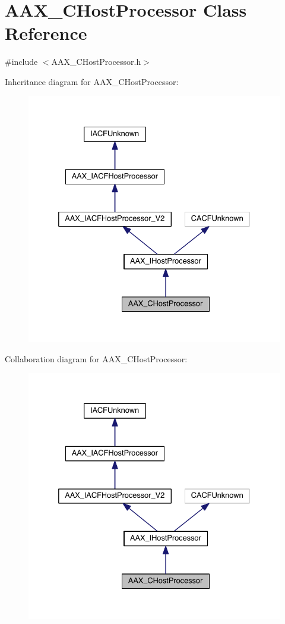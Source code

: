 \hypertarget{a00020}{}\section{A\+A\+X\+\_\+\+C\+Host\+Processor Class Reference}
\label{a00020}


{\ttfamily \#include $<$A\+A\+X\+\_\+\+C\+Host\+Processor.\+h$>$}



Inheritance diagram for A\+A\+X\+\_\+\+C\+Host\+Processor\+:
\nopagebreak
\begin{figure}[H]
\begin{center}
\leavevmode
\includegraphics[width=332pt]{a00421}
\end{center}
\end{figure}


Collaboration diagram for A\+A\+X\+\_\+\+C\+Host\+Processor\+:
\nopagebreak
\begin{figure}[H]
\begin{center}
\leavevmode
\includegraphics[width=332pt]{a00422}
\end{center}
\end{figure}


